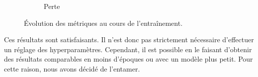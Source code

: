 \begin{figure}[hbt]
\begin{subfigure}{.5\textwidth}
\begin{center}
        \end{center}
        \caption{Perte}
        \label{fig.results.training.loss}
    \end{subfigure}
    \caption{Évolution des métriques au cours de l'entraînement.}
    \label{fig.results.training}
\end{figure}
Ces résultats sont satisfaisants.
Il n'est donc pas strictement nécessaire d'effectuer un réglage des hyperparamètres.
Cependant, il est possible en le faisant d'obtenir des résultats comparables 
en moins d'époques ou avec un modèle plus petit.
Pour cette raison, nous avons décidé de l'entamer.